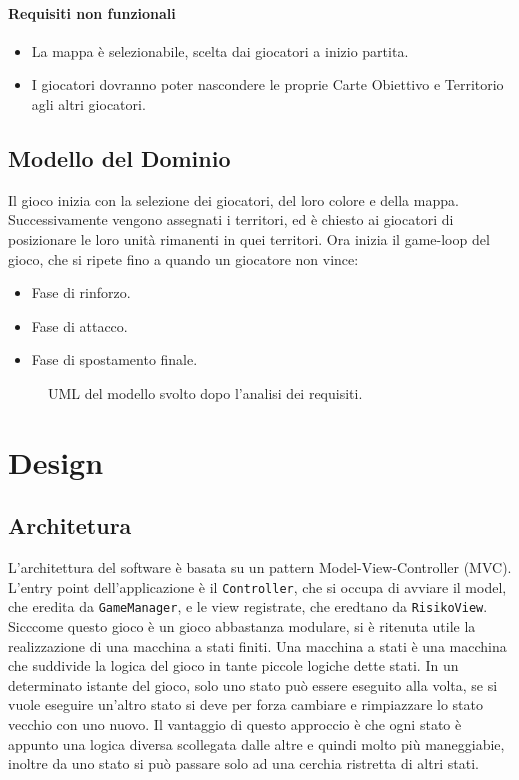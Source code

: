 \documentclass[a4paper,12pt]{report}
\begin{document}
\subsubsection{Requisiti non funzionali}
\begin{itemize}
	\item La mappa è selezionabile, scelta dai giocatori a inizio partita.
	\item I giocatori dovranno poter nascondere le proprie Carte Obiettivo e Territorio agli altri giocatori.
\end{itemize}

\section{Modello del Dominio}

Il gioco inizia con la selezione dei giocatori, del loro colore e della mappa.
Successivamente vengono assegnati i territori, ed è chiesto ai giocatori di posizionare le loro unità rimanenti in quei territori.
Ora inizia il game-loop del gioco, che si ripete fino a quando un giocatore non vince:
\begin{itemize}
	\item Fase di rinforzo.
	\item Fase di attacco.
	\item Fase di spostamento finale.
\end{itemize}

\begin{figure}[H]
	\centering
	
	\caption{UML del modello svolto dopo l'analisi dei requisiti.}
\end{figure}

\chapter{Design}

\section{Architetura}

L'architettura del software è basata su un pattern Model-View-Controller (MVC).
L'entry point dell'applicazione è il \texttt{Controller}, che si occupa di avviare il model, che eredita da \texttt{GameManager}, e le view registrate, che eredtano da \texttt{RisikoView}.
Sicccome questo gioco è un gioco abbastanza modulare, si è ritenuta utile la realizzazione di una macchina a stati finiti.
Una macchina a stati è una macchina che suddivide la logica del gioco in tante piccole logiche dette stati. In un determinato istante del gioco, solo uno stato può essere eseguito alla volta, se si vuole eseguire un'altro stato si deve per forza cambiare e rimpiazzare lo stato vecchio con uno nuovo.
Il vantaggio di questo approccio è che ogni stato è appunto una logica diversa scollegata dalle altre e quindi molto più maneggiabie, inoltre da uno stato si può passare solo ad una cerchia ristretta di altri stati.
\end{document}
